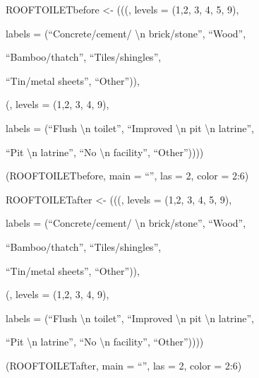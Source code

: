 \documentclass[letterpaper,10pt,english]{sphinxmanual}
\begin{document}
\begin{DUlineblock}{0em}
\item[] 
\item[] ROOFTOILETbefore \textless{}-
(((, levels =
(1,2, 3, 4, 5, 9),
\item[] labels = (“Concrete/cement/ \textbackslash{}n brick/stone”, “Wood”,
\item[] “Bamboo/thatch”, “Tiles/shingles”,
\item[] “Tin/metal sheets”, “Other”)),
\item[] (, levels = (1,2, 3, 4, 9),
\item[] labels = (“Flush \textbackslash{}n toilet”, “Improved \textbackslash{}n pit \textbackslash{}n latrine”,
\item[] “Pit \textbackslash{}n latrine”, “No \textbackslash{}n facility”, “Other”))))
\item[] (ROOFTOILETbefore, main = “”, las = 2, color = 2:6)
\item[] 
\item[] ROOFTOILETafter \textless{}-
(((, levels =
(1,2, 3, 4, 5, 9),
\item[] labels = (“Concrete/cement/ \textbackslash{}n brick/stone”, “Wood”,
\item[] “Bamboo/thatch”, “Tiles/shingles”,
\item[] “Tin/metal sheets”, “Other”)),
\item[] (, levels = (1,2, 3, 4,
9),
\item[] labels = (“Flush \textbackslash{}n toilet”, “Improved \textbackslash{}n pit \textbackslash{}n latrine”,
\item[] “Pit \textbackslash{}n latrine”, “No \textbackslash{}n facility”, “Other”))))
\item[] (ROOFTOILETafter, main = “”, las = 2, color = 2:6)
\end{DUlineblock}
\end{document}

